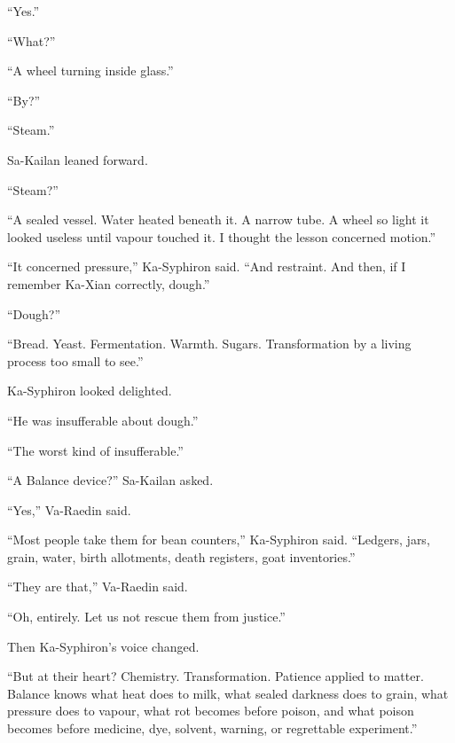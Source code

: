 “Yes.”\par
“What?”\par
“A wheel turning inside glass.”\par
“By?”\par
“Steam.”\par

Sa-Kailan leaned forward.\par

“Steam?”\par

“A sealed vessel.
Water heated beneath it.
A narrow tube.
A wheel so light it looked useless until vapour touched it.
I thought the lesson concerned motion.”\par

“It concerned pressure,” Ka-Syphiron said.
“And restraint.
And then, if I remember Ka-Xian correctly, dough.”\par

“Dough?”\par

“Bread.
Yeast.
Fermentation.
Warmth.
Sugars.
Transformation by a living process too small to see.”\par

Ka-Syphiron looked delighted.\par

“He was insufferable about dough.”\par

“The worst kind of insufferable.”\par

“A Balance device?” Sa-Kailan asked.\par

“Yes,” Va-Raedin said.\par
“Most people take them for bean counters,” Ka-Syphiron said.
“Ledgers, jars, grain, water, birth allotments, death registers, goat inventories.”\par

“They are that,” Va-Raedin said.\par

“Oh, entirely.
Let us not rescue them from justice.”\par

Then Ka-Syphiron’s voice changed.\par

“But at their heart?
Chemistry.
Transformation.
Patience applied to matter.
Balance knows what heat does to milk, what sealed darkness does to grain, what pressure does to vapour, what rot becomes before poison, and what poison becomes before medicine, dye, solvent, warning, or regrettable experiment.”\par


